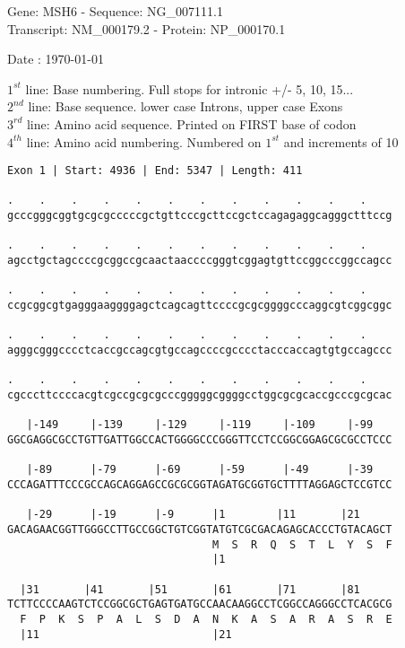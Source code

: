 \documentclass{article}
\begin{document}
\begin{center}
\begin{large}
Gene: MSH6 - Sequence: NG\_007111.1\\
Transcript: NM\_000179.2 - Protein: NP\_000170.1
 
 Date : \today
\end{large}
\end{center}
$1^{st}$ line: Base numbering. Full stops for intronic +/- 5, 10, 15...\\
$2^{nd}$ line: Base sequence. lower case Introns, upper case Exons\\
$3^{rd}$ line: Amino acid sequence. Printed on FIRST base of codon\\
$4^{th}$ line: Amino acid numbering. Numbered on $1^{st}$ and increments of 10\\
\begin{Verbatim}
Exon 1 | Start: 4936 | End: 5347 | Length: 411
 
.    .    .    .    .    .    .    .    .    .    .    .    
gcccgggcggtgcgcgcccccgctgttcccgcttccgctccagagaggcagggctttccg
  
.    .    .    .    .    .    .    .    .    .    .    .    
agcctgctagccccgcggccgcaactaaccccgggtcggagtgttccggcccggccagcc
  
.    .    .    .    .    .    .    .    .    .    .    .    
ccgcggcgtgagggaaggggagctcagcagttccccgcgcggggcccaggcgtcggcggc
  
.    .    .    .    .    .    .    .    .    .    .    .    
agggcgggcccctcaccgccagcgtgccagccccgcccctacccaccagtgtgccagccc
  
.    .    .    .    .    .    .    .    .    .    .    .    
cgcccttccccacgtcgccgcgcgcccgggggcggggcctggcgcgcaccgcccgcgcac
  
   |-149     |-139     |-129     |-119     |-109     |-99   
GGCGAGGCGCCTGTTGATTGGCCACTGGGGCCCGGGTTCCTCCGGCGGAGCGCGCCTCCC
  
   |-89      |-79      |-69      |-59      |-49      |-39   
CCCAGATTTCCCGCCAGCAGGAGCCGCGCGGTAGATGCGGTGCTTTTAGGAGCTCCGTCC
  
   |-29      |-19      |-9      |1        |11       |21     
GACAGAACGGTTGGGCCTTGCCGGCTGTCGGTATGTCGCGACAGAGCACCCTGTACAGCT
                                M  S  R  Q  S  T  L  Y  S  F
                                |1                          
  
  |31       |41       |51       |61       |71       |81     
TCTTCCCCAAGTCTCCGGCGCTGAGTGATGCCAACAAGGCCTCGGCCAGGGCCTCACGCG
  F  P  K  S  P  A  L  S  D  A  N  K  A  S  A  R  A  S  R  E
  |11                           |21                         
  

\end{Verbatim}
\end{document}
